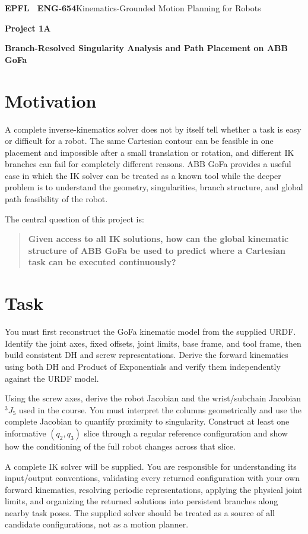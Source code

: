 \documentclass[11pt,a4paper]{article}
\begin{document}
{\small\textbf{EPFL \textbar\ ENG-654}\hfill Kinematics-Grounded Motion Planning for Robots}
\vspace{5mm}

{\color{epflred}\Large\bfseries Project 1A}

{\LARGE\bfseries Branch-Resolved Singularity Analysis and Path Placement on ABB GoFa\par}

\section*{Motivation}
A complete inverse-kinematics solver does not by itself tell whether a task is easy or difficult for a robot. The same Cartesian contour can be feasible in one placement and impossible after a small translation or rotation, and different IK branches can fail for completely different reasons. ABB GoFa provides a useful case in which the IK solver can be treated as a known tool while the deeper problem is to understand the geometry, singularities, branch structure, and global path feasibility of the robot.

The central question of this project is:

\begin{quote}
\textbf{Given access to all IK solutions, how can the global kinematic structure of ABB GoFa be used to predict where a Cartesian task can be executed continuously?}
\end{quote}

\section*{Task}
You must first reconstruct the GoFa kinematic model from the supplied URDF. Identify the joint axes, fixed offsets, joint limits, base frame, and tool frame, then build consistent DH and screw representations. Derive the forward kinematics using both DH and Product of Exponentials and verify them independently against the URDF model.

Using the screw axes, derive the robot Jacobian and the wrist/subchain Jacobian $^{3}J_{5}$ used in the course. You must interpret the columns geometrically and use the complete Jacobian to quantify proximity to singularity. Construct at least one informative $(q_2,q_3)$ slice through a regular reference configuration and show how the conditioning of the full robot changes across that slice.

A complete IK solver will be supplied. You are responsible for understanding its input/output conventions, validating every returned configuration with your own forward kinematics, resolving periodic representations, applying the physical joint limits, and organizing the returned solutions into persistent branches along nearby task poses. The supplied solver should be treated as a source of all candidate configurations, not as a motion planner.
\end{document}
